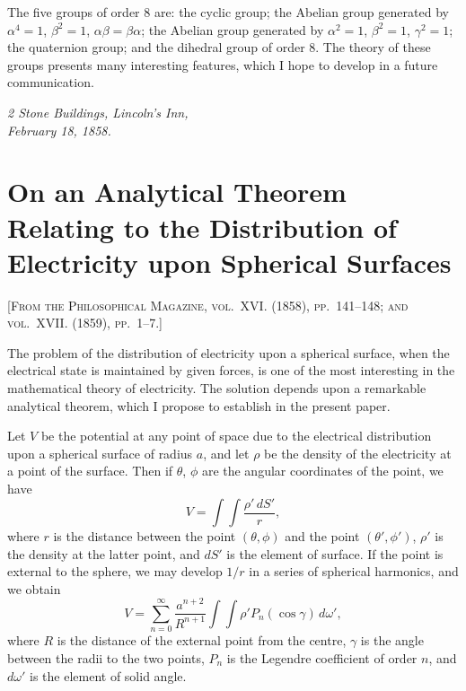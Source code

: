 \documentclass[11pt,a4paper]{article}
\begin{document}
The five groups of order 8 are: the cyclic group; the Abelian group generated by $\alpha^4=1$, $\beta^2=1$, $\alpha\beta=\beta\alpha$; the Abelian group generated by $\alpha^2=1$, $\beta^2=1$, $\gamma^2=1$; the quaternion group; and the dihedral group of order 8. The theory of these groups presents many interesting features, which I hope to develop in a future communication.

\medskip
\noindent\textit{2 Stone Buildings, Lincoln's Inn,\\February 18, 1858.}

\newpage



\section{On an Analytical Theorem Relating to the Distribution of Electricity upon Spherical Surfaces}

\textsc{[From the Philosophical Magazine, vol.~XVI. (1858), pp.~141--148; and vol.~XVII. (1859), pp.~1--7.]}
\label{paper:244}

\setcounter{page}{93}

The problem of the distribution of electricity upon a spherical surface, when the electrical state is maintained by given forces, is one of the most interesting in the mathematical theory of electricity. The solution depends upon a remarkable analytical theorem, which I propose to establish in the present paper.

Let $V$ be the potential at any point of space due to the electrical distribution upon a spherical surface of radius $a$, and let $\rho$ be the density of the electricity at a point of the surface. Then if $\theta$, $\phi$ are the angular coordinates of the point, we have
\[
V = \int\!\!\int \frac{\rho' \, dS'}{r},
\]
where $r$ is the distance between the point $(\theta,\phi)$ and the point $(\theta',\phi')$, $\rho'$ is the density at the latter point, and $dS'$ is the element of surface. If the point is external to the sphere, we may develop $1/r$ in a series of spherical harmonics, and we obtain
\[
V = \sum_{n=0}^{\infty} \frac{a^{n+2}}{R^{n+1}} \int\!\!\int \rho' P_n(\cos\gamma) \, d\omega',
\]
where $R$ is the distance of the external point from the centre, $\gamma$ is the angle between the radii to the two points, $P_n$ is the Legendre coefficient of order $n$, and $d\omega'$ is the element of solid angle.
\end{document}

